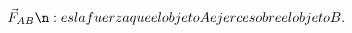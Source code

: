 \documentclass[preview]{standalone}
\begin{document}
\begin{align*}
\vec{F}_{AB}\n: es la fuerza que el objeto A ejerce sobre el objeto B.
\end{align*}
\end{document}
